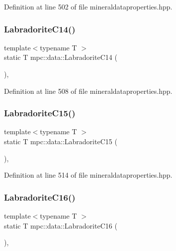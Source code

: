 Definition at line 502 of file mineraldataproperties.\+hpp.

\mbox{\label{namespacempc_1_1data_aed81645061326818a8cd40411834cf0e}} 
\subsubsection{\texorpdfstring{Labradorite\+C14()}{LabradoriteC14()}}
{\footnotesize\ttfamily template$<$typename T $>$ \\
static T mpc\+::data\+::\+Labradorite\+C14 (\begin{DoxyParamCaption}{ }\end{DoxyParamCaption})\hspace{0.3cm}{\ttfamily [inline]}, {\ttfamily [static]}}



Definition at line 508 of file mineraldataproperties.\+hpp.

\mbox{\label{namespacempc_1_1data_a9c735ddee053b30adeae7b71c1cfd62c}} 
\subsubsection{\texorpdfstring{Labradorite\+C15()}{LabradoriteC15()}}
{\footnotesize\ttfamily template$<$typename T $>$ \\
static T mpc\+::data\+::\+Labradorite\+C15 (\begin{DoxyParamCaption}{ }\end{DoxyParamCaption})\hspace{0.3cm}{\ttfamily [inline]}, {\ttfamily [static]}}



Definition at line 514 of file mineraldataproperties.\+hpp.

\mbox{\label{namespacempc_1_1data_a4adbd6259b0fd658eac112b57e5b040f}} 
\subsubsection{\texorpdfstring{Labradorite\+C16()}{LabradoriteC16()}}
{\footnotesize\ttfamily template$<$typename T $>$ \\
static T mpc\+::data\+::\+Labradorite\+C16 (\begin{DoxyParamCaption}{ }\end{DoxyParamCaption})\hspace{0.3cm}{\ttfamily [inline]}, {\ttfamily [static]}}



